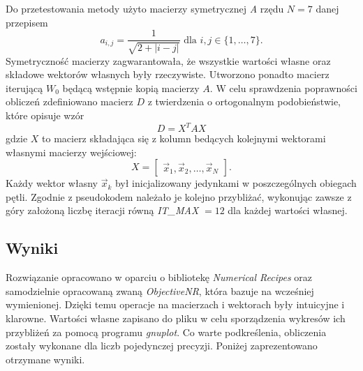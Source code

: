 Do przetestowania metody użyto macierzy symetrycznej \textit{A} rzędu $N = 7$ danej przepisem
\begin{equation}
a_{i,j} = \frac{1}{\sqrt{2 + |i - j|}} \text{ dla } i,j \in \{1,\dots,7\}.
\end{equation}
Symetryczność macierzy zagwarantowała, że wszystkie wartości własne oraz składowe wektorów własnych były rzeczywiste. Utworzono ponadto macierz iterującą $ W_0 $ będącą wstępnie kopią macierzy $ A $. W celu sprawdzenia poprawności obliczeń zdefiniowano macierz $ D $ z twierdzenia o ortogonalnym podobieństwie, które opisuje wzór
\begin{equation}
D = X^T AX
\label{macierzD}
\end{equation}
gdzie $ X $ to macierz składająca się z kolumn bedących kolejnymi wektorami własnymi macierzy wejściowej:
\begin{equation}
X = 
\begin{bmatrix}
\vec{x}_1, \vec{x}_2, \dots, \vec{x}_N
\end{bmatrix}
.
\end{equation}
Każdy wektor własny $ \vec{x}_k $ był inicjalizowany jedynkami w poszczególnych obiegach pętli. Zgodnie z pseudokodem należało je kolejno przybliżać, wykonując zawsze z góry założoną liczbę iteracji równą \textit{IT\_MAX} $ = 12 $ dla każdej wartości własnej.

\subsection{Wyniki}

Rozwiązanie opracowano w oparciu o bibliotekę\textit{ Numerical Recipes} oraz samodzielnie opracowaną zwaną \textit{ObjectiveNR}, która bazuje na wcześniej wymienionej. Dzięki temu operacje na macierzach i wektorach były intuicyjne i klarowne. Wartości własne zapisano do pliku w celu sporządzenia wykresów ich przybliżeń za pomocą programu \textit{gnuplot}. Co warte podkreślenia, obliczenia zostały wykonane dla liczb pojedynczej precyzji. Poniżej zaprezentowano otrzymane wyniki.

